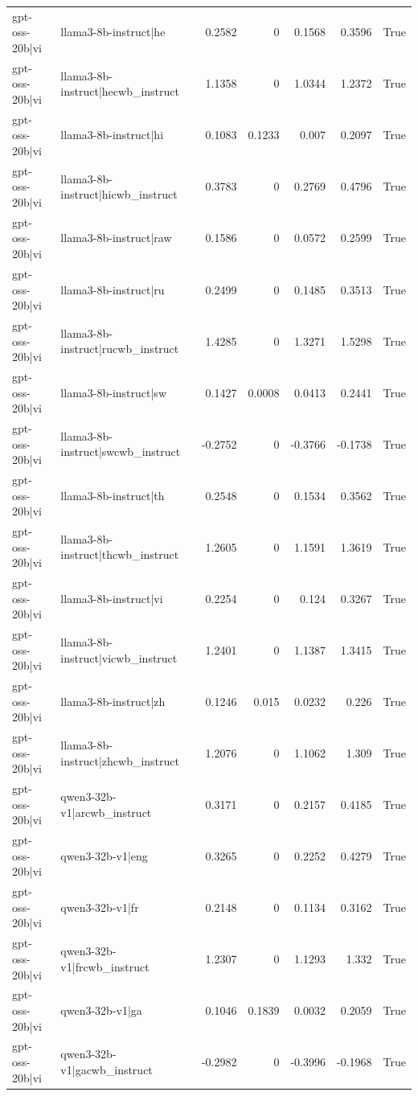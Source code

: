 \begin{table}
\begin{tabular}{l l r r r r l}
gpt-oss-20b|vi & llama3-8b-instruct|he & 0.2582 & 0 & 0.1568 & 0.3596 & True \\
gpt-oss-20b|vi & llama3-8b-instruct|hecwb_instruct & 1.1358 & 0 & 1.0344 & 1.2372 & True \\
gpt-oss-20b|vi & llama3-8b-instruct|hi & 0.1083 & 0.1233 & 0.007 & 0.2097 & True \\
gpt-oss-20b|vi & llama3-8b-instruct|hicwb_instruct & 0.3783 & 0 & 0.2769 & 0.4796 & True \\
gpt-oss-20b|vi & llama3-8b-instruct|raw & 0.1586 & 0 & 0.0572 & 0.2599 & True \\
gpt-oss-20b|vi & llama3-8b-instruct|ru & 0.2499 & 0 & 0.1485 & 0.3513 & True \\
gpt-oss-20b|vi & llama3-8b-instruct|rucwb_instruct & 1.4285 & 0 & 1.3271 & 1.5298 & True \\
gpt-oss-20b|vi & llama3-8b-instruct|sw & 0.1427 & 0.0008 & 0.0413 & 0.2441 & True \\
gpt-oss-20b|vi & llama3-8b-instruct|swcwb_instruct & -0.2752 & 0 & -0.3766 & -0.1738 & True \\
gpt-oss-20b|vi & llama3-8b-instruct|th & 0.2548 & 0 & 0.1534 & 0.3562 & True \\
gpt-oss-20b|vi & llama3-8b-instruct|thcwb_instruct & 1.2605 & 0 & 1.1591 & 1.3619 & True \\
gpt-oss-20b|vi & llama3-8b-instruct|vi & 0.2254 & 0 & 0.124 & 0.3267 & True \\
gpt-oss-20b|vi & llama3-8b-instruct|vicwb_instruct & 1.2401 & 0 & 1.1387 & 1.3415 & True \\
gpt-oss-20b|vi & llama3-8b-instruct|zh & 0.1246 & 0.015 & 0.0232 & 0.226 & True \\
gpt-oss-20b|vi & llama3-8b-instruct|zhcwb_instruct & 1.2076 & 0 & 1.1062 & 1.309 & True \\
gpt-oss-20b|vi & qwen3-32b-v1|arcwb_instruct & 0.3171 & 0 & 0.2157 & 0.4185 & True \\
gpt-oss-20b|vi & qwen3-32b-v1|eng & 0.3265 & 0 & 0.2252 & 0.4279 & True \\
gpt-oss-20b|vi & qwen3-32b-v1|fr & 0.2148 & 0 & 0.1134 & 0.3162 & True \\
gpt-oss-20b|vi & qwen3-32b-v1|frcwb_instruct & 1.2307 & 0 & 1.1293 & 1.332 & True \\
gpt-oss-20b|vi & qwen3-32b-v1|ga & 0.1046 & 0.1839 & 0.0032 & 0.2059 & True \\
gpt-oss-20b|vi & qwen3-32b-v1|gacwb_instruct & -0.2982 & 0 & -0.3996 & -0.1968 & True \\

\end{tabular}
\end{table}
